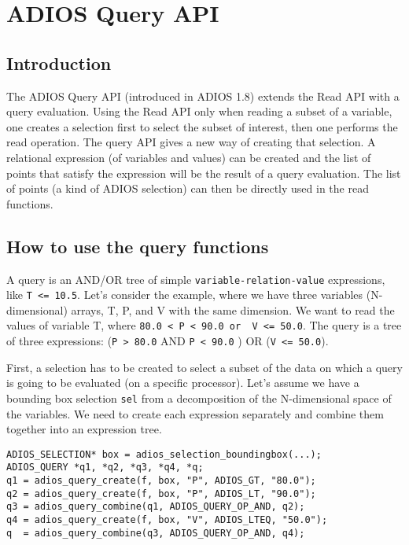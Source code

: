 \chapter{ADIOS Query API}
\label{chapter:query_api}

\section{Introduction}

The ADIOS Query API (introduced in ADIOS 1.8) extends the Read API with a query evaluation. Using the Read API only when reading a subset of a variable, one creates a selection first to select the subset of interest, then one performs the read operation. The query API gives a new way of creating that selection. A relational expression (of variables and values) can be created and the list of points that satisfy the expression will be the result of a query evaluation. The list of points (a kind of ADIOS selection) can then be directly used in the read functions. 


\section{How to use the query functions}
\label{sec:query-howto}
A query is an AND/OR tree of simple \verb+variable-relation-value+ expressions, like 
\verb+T <= 10.5+. Let's consider the example, where we have three variables (N-dimensional) arrays, T, P, and V with the same dimension. We want to read the values of variable T, where  \verb+80.0 < P < 90.0 or  V <= 50.0+. The query is a tree of three expressions: \linebreak
(\verb+P > 80.0+ AND \verb+P < 90.0+ )  OR (\verb+V <= 50.0+).

First, a selection has to be created to select a subset of the data on which a query is going to be evaluated (on a specific processor). Let's assume we have a bounding box selection 
\verb+sel+ from a decomposition of the N-dimensional space of the variables. We need to create each expression separately and combine them together into an expression tree.

\begin{lstlisting}[alsolanguage=C]
ADIOS_SELECTION* box = adios_selection_boundingbox(...);
ADIOS_QUERY *q1, *q2, *q3, *q4, *q;
q1 = adios_query_create(f, box, "P", ADIOS_GT, "80.0");
q2 = adios_query_create(f, box, "P", ADIOS_LT, "90.0");
q3 = adios_query_combine(q1, ADIOS_QUERY_OP_AND, q2);
q4 = adios_query_create(f, box, "V", ADIOS_LTEQ, "50.0");
q  = adios_query_combine(q3, ADIOS_QUERY_OP_AND, q4);
\end{lstlisting}


